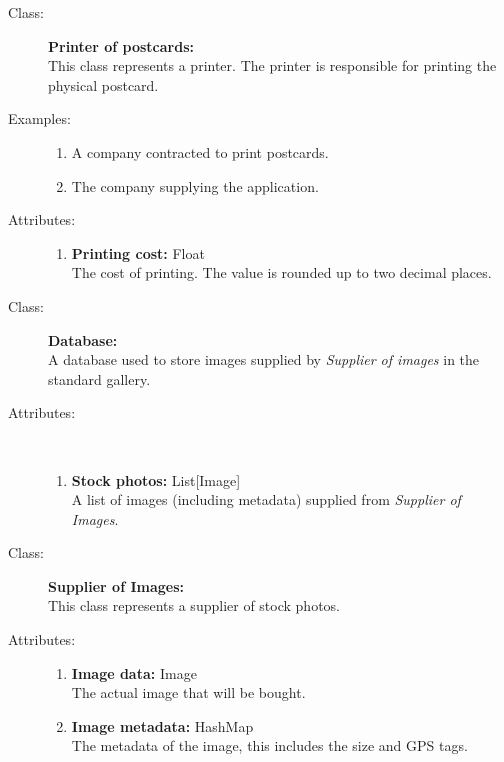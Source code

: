 \documentclass[10pt,a4paper]{article}
\begin{document}
\hrulefill

\begin{description}
\item[Class:] \textbf{Printer of postcards:} \hfill \\
This class represents a printer. The printer is responsible for printing the physical postcard. 

\item[Examples:] \hfill
\begin{enumerate}
\item A company contracted to print postcards.
\item The company supplying the application.
\end{enumerate}

\item[Attributes:] \hfill
\begin{enumerate}
\item \textbf{Printing cost:} Float \hfill \\The cost of printing. The value is rounded up to two decimal places.
\end{enumerate}
\end{description}

\hrulefill

\begin{description}
\item[Class:] \textbf{Database:} \hfill \\
A database used to store images supplied by \textit{Supplier of images} in the standard gallery. 

\item[Attributes:] \hfill \\
\begin{enumerate}
\item \textbf{Stock photos:} List[Image] \hfill \\A list of images (including metadata) supplied from \textit{Supplier of Images}.
\end{enumerate}
\end{description}

\hrulefill

\begin{description}
\item[Class:] \textbf{Supplier of Images:} \hfill \\
This class represents a supplier of stock photos.

\item[Attributes:] \hfill
\begin{enumerate}
\item \textbf{Image data:} Image \hfill \\The actual image that will be bought.
\item \textbf{Image metadata:} HashMap \hfill \\The metadata of the image, this includes the size and GPS tags.
\end{enumerate}
\end{description}
\end{document}
